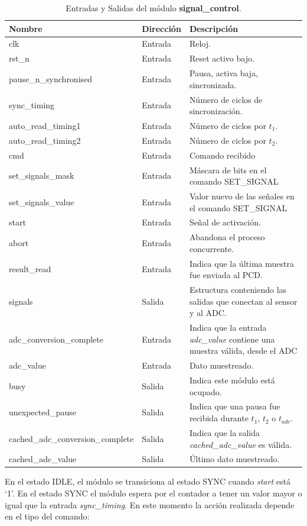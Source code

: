\documentclass[a4paper, twoside, 11pt]{report}
\begin{document}
\begin{table}[htb]
  \centering
  \tablezebra
  \begin{tabulary}{\linewidth}{l|l|L}
    \setcounter{rownum}{0}
    \textbf{Nombre}&\textbf{Dirección}&\textbf{Descripción} \\
    \hline
    clk&Entrada&Reloj. \\
    rst\_n&Entrada&Reset activo bajo. \\
    pause\_n\_synchronised&Entrada&Pausa, activa baja, sincronizada. \\
    sync\_timing&Entrada&Número de ciclos de sincronización. \\
    auto\_read\_timing1&Entrada&Número de ciclos por $t_1$. \\
    auto\_read\_timing2&Entrada&Número de ciclos por $t_2$. \\
    cmd&Entrada&Comando recibido \\
    set\_signals\_mask&Entrada&Máscara de bits en el comando SET\_SIGNAL \\
    set\_signals\_value&Entrada&Valor nuevo de las señales en el comando SET\_SIGNAL \\
    start&Entrada&Señal de activación. \\
    abort&Entrada&Abandona el proceso concurrente. \\
    result\_read&Entrada&Indica que la última muestra fue enviada al PCD. \\
    signals&Salida&Estructura conteniendo las salidas que conectan al sensor y al ADC. \\
    adc\_conversion\_complete&Entrada&Indica que la entrada \textit{adc\_value} contiene una muestra válida, desde el ADC \\
    adc\_value&Entrada&Dato muestreado. \\
    busy&Salida&Indica este módulo está ocupado. \\
    unexpected\_pause&Salida&Indica que una pausa fue recibida durante $t_1$, $t_2$ o $t_{adc}$. \\
    cached\_adc\_conversion\_complete&Salida&Indica que la salida \textit{cached\_adc\_value} es válida. \\
    cached\_adc\_value&Salida&Último dato muestreado. \\
  \end{tabulary}
  \caption{Entradas y Salidas del módulo \textbf{signal\_control}.}
  \label{tab:ports_signal_control}
\end{table}

En el estado IDLE, el módulo se transiciona al estado SYNC cuando \textit{start} está ‘1’. En el estado SYNC el módulo espera por el contador a tener un valor mayor o igual que la entrada \textit{sync\_timing}. En este momento la acción realizada depende en el tipo del comando:
\end{document}
